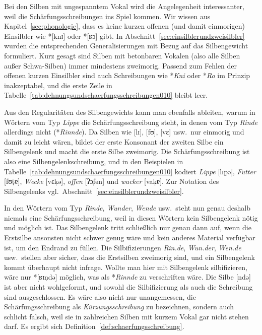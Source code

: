 Bei den Silben mit ungespanntem Vokal wird die Angelegenheit interessanter, weil die Schärfungsschreibungen ins Spiel kommen.
Wir wissen aus Kapitel~\ref{sec:phonologie}, dass es keine kurzen offenen (und damit einmorigen) Einsilbler wie *[knɪ] oder *[ʁɔ] gibt.
In Abschnitt~\ref{sec:einsilblerundzweisilbler} wurden die entsprechenden Generalisierungen mit Bezug auf das Silbengewicht formuliert.
Kurz gesagt sind Silben mit betonbaren Vokalen (also alle Silben außer Schwa-Silben) immer mindestens zweimorig.
Passend zum Fehlen der offenen kurzen Einsilbler sind auch Schreibungen wie *\textit{Kni} oder *\textit{Ro} im Prinzip inakzeptabel, und die erste Zeile in Tabelle~\ref{tab:dehnungsundschaerfungsschreibungen010} bleibt leer.

Aus den Regularitäten des Silbengewichts kann man ebenfalls ableiten, warum in Wörtern vom Typ \textit{Lippe} die Schärfungsschreibung steht, in denen vom Typ \textit{Rinde} allerdings nicht (*\textit{Rinnde}).
Da Silben wie [lɪ], [fʊ], [vɛ] usw.\ nur einmorig und damit zu leicht wären, bildet der erste Konsonant der zweiten Silbe ein Silbengelenk und macht die erste Silbe zweimorig.
Die Schärfungsschreibung ist also eine Silbengelenkschreibung, und in den Beispielen in Tabelle~\ref{tab:dehnungsundschaerfungsschreibungen010} kodiert \textit{Lippe} [lɪp̣ə], \textit{Futter} [fʊṭɐ], \textit{Wecke} [vɛḳə], \textit{offen} [ʔɔf̣ən] und \textit{wacker} [vaḳɐ].
Zur Notation des Silbengelenks vgl.\ Abschnitt~\ref{sec:einsilblerundzweisilbler}.

In den Wörtern vom Typ \textit{Rinde}, \textit{Wunder}, \textit{Wende} usw.\ steht nun genau deshalb niemals eine Schärfungsschreibung, weil in diesen Wörtern kein Silbengelenk nötig und möglich ist.
Das Silbengelenk tritt schließlich nur genau dann auf, wenn die Erstsilbe ansonsten nicht schwer genug wäre und kein anderes Material verfügbar ist, um den Endrand zu füllen.
Die Silbifizierungen \textit{Rin.de}, \textit{Wun.der}, \textit{Wen.de} usw.\ stellen aber sicher, dass die Erstsilben zweimorig sind, und ein Silbengelenk kommt überhaupt nicht infrage.
Wollte man hier mit Silbengelenk silbifizieren, wäre nur *[ʁɪṇdə] möglich, was als *\textit{Rinnde} zu verschriften wäre.
Die Silbe [ndə] ist aber nicht wohlgeformt, und sowohl die Silbifizierung als auch die Schreibung sind ausgeschlossen.
Es wäre also nicht nur unangemessen, die Schärfungsschreibung als \textit{Kürzungsschreibung} zu bezeichnen, sondern auch schlicht falsch, weil sie in zahlreichen Silben mit kurzem Vokal gar nicht stehen darf.
Es ergibt sich Definition~\ref{def:schaerfungsschreibung}.

